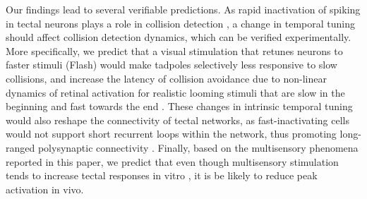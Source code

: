 \documentclass{article}
\begin{document}
Our findings lead to several verifiable predictions. As rapid inactivation of spiking in tectal neurons plays a role in collision detection \citep{khakhalin2014,jang2016}, a change in temporal tuning should affect collision detection dynamics, which can be verified experimentally. More specifically, we predict that a visual stimulation that retunes neurons to faster stimuli (Flash) would make tadpoles selectively less responsive to slow collisions, and increase the latency of collision avoidance due to non-linear dynamics of retinal activation for realistic looming stimuli that are slow in the beginning and fast towards the end \citep{jang2016}. These changes in intrinsic temporal tuning would also reshape the connectivity of tectal networks, as fast-inactivating cells would not support short recurrent loops within the network, thus promoting long-ranged polysynaptic connectivity \citep{fiete2010stdp,clopath2010stdp}. Finally, based on the multisensory phenomena reported in this paper, we predict that even though multisensory stimulation tends to increase tectal responses in vitro \citep{felch2016,truszkowski2017}, it is be likely to reduce peak activation in vivo. 

\end{document}
